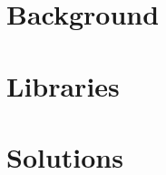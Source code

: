 \documentclass[12pt,a4paper,oneside]{book}
\begin{document}


\tableofcontents

\part{Background}


\part{Libraries}

\part{Solutions}


\listoftodos
\end{document}
